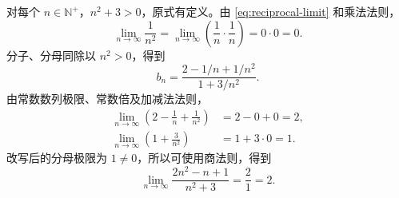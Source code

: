 \documentclass[UTF8,fontset=fandol,11pt]{ctexart}
\begin{document}
对每个 $n\in\mathbb{N}^+$，$n^2+3>0$，原式有定义。由 \eqref{eq:reciprocal-limit} 和乘法法则，
\[
\lim_{n\to\infty}\frac{1}{n^2}
=\lim_{n\to\infty}\left(\frac{1}{n}\cdot\frac{1}{n}\right)
=0\cdot0=0.
\]
分子、分母同除以 $n^2>0$，得到
\[
b_n=\frac{2-1/n+1/n^2}{1+3/n^2}.
\]
由常数数列极限、常数倍及加减法法则，
\[
\begin{aligned}
\lim_{n\to\infty}\left(2-\frac{1}{n}+\frac{1}{n^2}\right)&=2-0+0=2,\\
\lim_{n\to\infty}\left(1+\frac{3}{n^2}\right)&=1+3\cdot0=1.
\end{aligned}
\]
改写后的分母极限为 $1\ne0$，所以可使用商法则，得到
\[
\lim_{n\to\infty}\frac{2n^2-n+1}{n^2+3}=\frac{2}{1}=2.
\]\par
\end{document}
